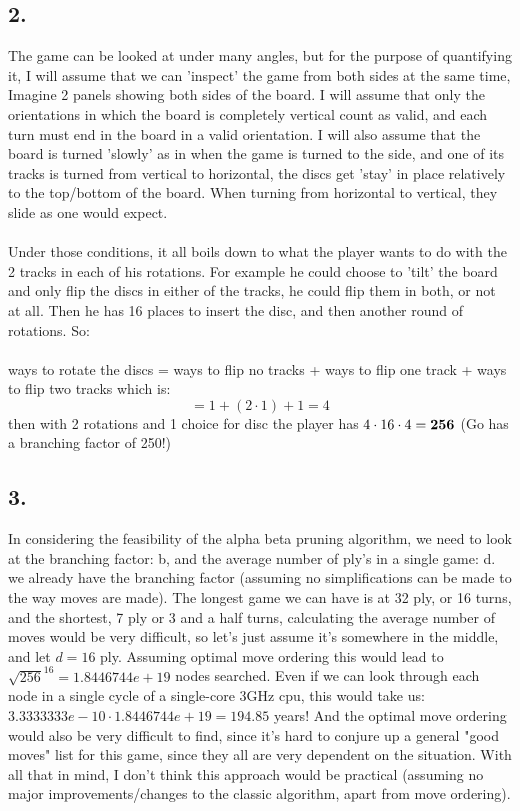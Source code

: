\documentclass{report}
\begin{document}
\subsection*{2.}
The game can be looked at under many angles, but for the purpose of quantifying it, I will assume that we can 'inspect' the game from both sides at the same time, Imagine 2 panels showing both sides of the board. I will assume that only the orientations in which the board is completely vertical count as valid, and each turn must end in the board in a valid orientation. I will also assume that the board is turned 'slowly' as in when the game is turned to the side, and one of its tracks is turned from vertical to horizontal, the discs get 'stay' in place relatively to the top/bottom of the board. When turning from horizontal to vertical, they slide as one would expect.\\\\
Under those conditions, it all boils down to what the player wants to do with the 2 tracks in each of his rotations. For example he could choose to 'tilt' the board and only flip the discs in either of the tracks, he could flip them in both, or not at all. Then he has 16 places to insert the disc, and then another round of rotations. So:\\\\
ways to rotate the discs = ways to flip no tracks + ways to flip one track + ways to flip two tracks
which is:
\begin{equation*}
    = 1 + (2 \cdot 1) + 1 = 4
\end{equation*}
then with 2 rotations and 1 choice for disc the player has $4 \cdot 16 \cdot 4 = \textbf{256}$  (Go has a branching factor of 250!)
\subsection*{3.}
In considering the feasibility of the alpha beta pruning algorithm, we need to look at the branching factor: b, and the average number of ply's in a single game: d.
we already have the branching factor (assuming no simplifications can be made to the way moves are made). The longest game we can have is at 32 ply, or 16 turns, and the shortest, 7 ply or 3 and a half turns, calculating the average number of moves would be very difficult, so let's just assume it's somewhere in the middle, and let $d = 16$ ply. Assuming optimal move ordering this would lead to $\sqrt{256}^{16} = 1.8446744e+19$ nodes searched. Even if we can look through each node in a single cycle of a single-core 3GHz cpu, this would take us: $3.3333333e-10 \cdot 1.8446744e+19 = 194.85 $ years! And the optimal move ordering would also be very difficult to find, since it's hard to conjure up a general "good moves" list for this game, since they all are very dependent on the situation. With all that in mind, I don't think this approach would be practical (assuming no major improvements/changes to the classic algorithm, apart from move ordering).
\end{document}
